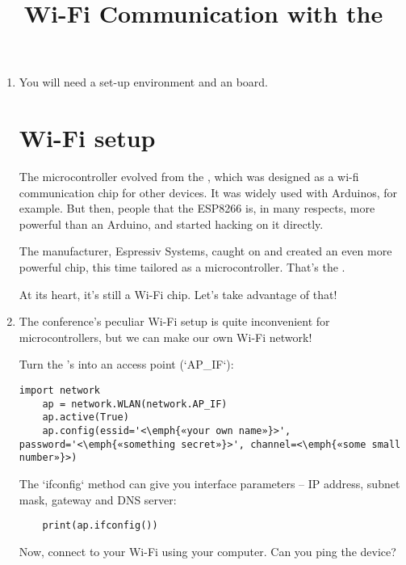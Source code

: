 \documentclass{../tutorial}
\title{Wi-Fi Communication with the \abbr{ESP32}}
\begin{document}
\begin{enumerate}

\item
    You will need a set-up environment and an  board.

\section{Wi-Fi setup}

    The  microcontroller evolved from the ,
    which was designed as a wi-fi communication chip for other devices.
    It was widely used with Arduinos, for example.
    But then, people that the ESP8266 is, in many respects, more powerful than
    an Arduino, and started hacking on it directly.

    The  manufacturer, Espressiv Systems, caught on and created
    an even more powerful chip, this time tailored as a microcontroller.
    That's the .

    At its heart, it's still a Wi-Fi chip. Let's take advantage of that!


\item
    The conference's peculiar Wi-Fi setup is quite inconvenient for
    microcontrollers, but we can make our own Wi-Fi network!

    Turn the 's into an access point (`AP_IF`):

    \begin{lstlisting}[escapeinside=<>]
    import network
    ap = network.WLAN(network.AP_IF)
    ap.active(True)
    ap.config(essid='<\emph{«your own name»}>', password='<\emph{«something secret»}>', channel=<\emph{«some small number»}>)
    \end{lstlisting}

    \begin{comment}
        Ideally, run `nmcli d wifi` on your Linux computer to see occupied
        Wi-Fi channels, and pick one you don't see.
    \end{comment}

    The `ifconfig` method can give you interface parameters – IP address,
    subnet mask, gateway and DNS server:

    \begin{lstlisting}
    print(ap.ifconfig())
    \end{lstlisting}

    Now, connect to your Wi-Fi using your computer.
    Can you ping the device?


\end{enumerate}
\end{document}
